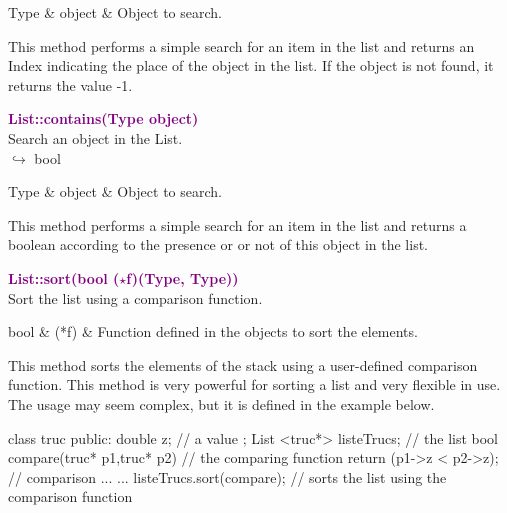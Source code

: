 \begin{tcolorbox}[width=\textwidth,myArgs,tabularx={ll|R}]
Type & object & Object to search.
\end{tcolorbox}

This method performs a simple search for an item in the list and returns an Index indicating the place of the object in the list.
If the object is not found, it returns the value -1.

\textcolor{purple}{\textbf{List::contains(Type object)}}\label{List::contains(Type object)}\\
Search an object in the List.\\ \hspace*{10mm}$\hookrightarrow$ bool

\begin{tcolorbox}[width=\textwidth,myArgs,tabularx={ll|R}]
Type & object & Object to search.
\end{tcolorbox}

This method performs a simple search for an item in the list and returns a boolean according to the presence or or not of this object in the list.

\textcolor{purple}{\textbf{List::sort(bool ($\star$f)(Type, Type))}}\label{List::sort(bool (*f)(Type, Type))}\\
Sort the list using a comparison function.

\begin{tcolorbox}[width=\textwidth,myArgs,tabularx={ll|R}]
bool & (*f) & Function defined in the objects to sort the elements.
\end{tcolorbox}

This method sorts the elements of the stack using a user-defined comparison function.
This method is very powerful for sorting a list and very flexible in use.
The usage may seem complex, but it is defined in the example below.
\begin{CppListing}
class truc
{
  public:
  double z; // a value
};
List <truc*> listeTrucs; // the list
bool compare(truc* p1,truc* p2) // the comparing function
{
  return (p1->z < p2->z); // comparison
}
...
{
...
listeTrucs.sort(compare); // sorts the list using the comparison function
}
\end{CppListing}

